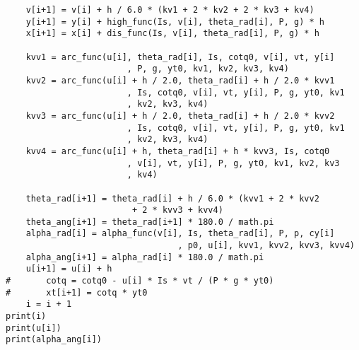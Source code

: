 \documentclass{ctexart}
\begin{document}
\begin{lstlisting}
	v[i+1] = v[i] + h / 6.0 * (kv1 + 2 * kv2 + 2 * kv3 + kv4)
	y[i+1] = y[i] + high_func(Is, v[i], theta_rad[i], P, g) * h
	x[i+1] = x[i] + dis_func(Is, v[i], theta_rad[i], P, g) * h
	
	kvv1 = arc_func(u[i], theta_rad[i], Is, cotq0, v[i], vt, y[i]
                        , P, g, yt0, kv1, kv2, kv3, kv4)
	kvv2 = arc_func(u[i] + h / 2.0, theta_rad[i] + h / 2.0 * kvv1
                        , Is, cotq0, v[i], vt, y[i], P, g, yt0, kv1
                        , kv2, kv3, kv4)
	kvv3 = arc_func(u[i] + h / 2.0, theta_rad[i] + h / 2.0 * kvv2
                        , Is, cotq0, v[i], vt, y[i], P, g, yt0, kv1
                        , kv2, kv3, kv4)
	kvv4 = arc_func(u[i] + h, theta_rad[i] + h * kvv3, Is, cotq0
                        , v[i], vt, y[i], P, g, yt0, kv1, kv2, kv3
                        , kv4)

	theta_rad[i+1] = theta_rad[i] + h / 6.0 * (kvv1 + 2 * kvv2
                         + 2 * kvv3 + kvv4)
	theta_ang[i+1] = theta_rad[i+1] * 180.0 / math.pi
	alpha_rad[i] = alpha_func(v[i], Is, theta_rad[i], P, p, cy[i]
                                  , p0, u[i], kvv1, kvv2, kvv3, kvv4)	
	alpha_ang[i+1] = alpha_rad[i] * 180.0 / math.pi
	u[i+1] = u[i] + h
#       cotq = cotq0 - u[i] * Is * vt / (P * g * yt0)
#       xt[i+1] = cotq * yt0
	i = i + 1
print(i)
print(u[i])
print(alpha_ang[i])


\end{lstlisting}
\end{document}
